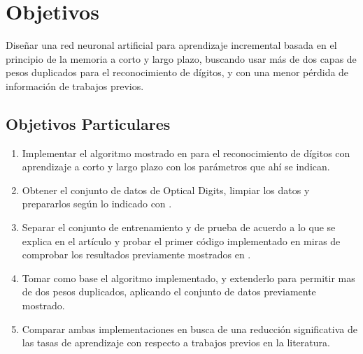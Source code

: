 \section{Objetivos}
    Diseñar una red neuronal artificial para aprendizaje incremental basada en el principio de la memoria a corto y largo plazo, buscando usar más de dos capas de pesos duplicados para el reconocimiento de dígitos, y con una menor p\'erdida de información de trabajos previos.
    \subsection{Objetivos Particulares}
        \begin{enumerate}
            \item Implementar el algoritmo mostrado en \cite{bullinaria2009} para el reconocimiento de dígitos con aprendizaje a corto y largo plazo con los parámetros que ahí se indican.
            \item Obtener el conjunto de datos de Optical Digits, limpiar los datos y prepararlos según lo indicado con \cite{bullinaria2009}.
            \item Separar el conjunto de entrenamiento y de prueba de acuerdo a lo que se explica en el artículo \cite{bullinaria2009} y probar el primer código implementado en miras de comprobar los resultados previamente mostrados en \cite{bullinaria2009}.
            \item Tomar como base el algoritmo implementado, y extenderlo para permitir mas de dos pesos duplicados, aplicando el conjunto de datos previamente mostrado.
            \item Comparar ambas implementaciones en busca de una reducción significativa de las tasas de aprendizaje con respecto a trabajos previos en la literatura.
        \end{enumerate}
